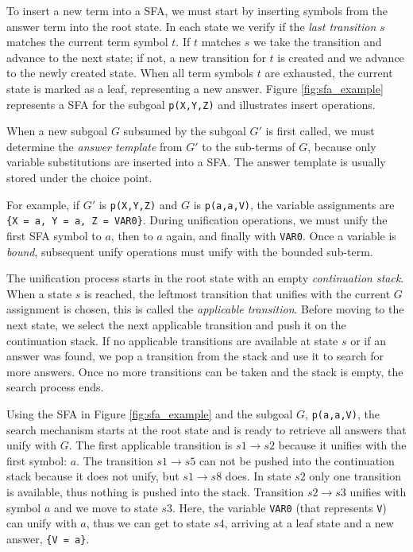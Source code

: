 To insert a new term into a SFA, we must start by inserting symbols from the answer term into the root state.
In each state we verify if the \textit{last transition} $s$ matches the current term symbol $t$. If $t$ matches $s$
we take the transition and advance to the next state; if not, a new transition for $t$ is created and we advance
to the newly created state. When all term symbols $t$ are exhausted, the current state is marked as a leaf,
representing a new answer.
Figure \ref{fig:sfa_example} represents a SFA for the subgoal \texttt{p(X,Y,Z)} and
illustrates insert operations.

When a new subgoal $G$ subsumed by the subgoal $G'$ is first called, we must determine the \textit{answer template}
from $G'$ to the sub-terms of $G$, because only variable substitutions are inserted into a SFA.
The answer template is usually stored under the choice point.

For example, if $G'$ is \texttt{p(X,Y,Z)} and $G$ is \texttt{p(a,a,V)}, the variable assignments
are \texttt{\{X~=~a,~Y~=~a,~Z~=~VAR0\}}. During unification operations, we must unify the first SFA symbol
to $a$, then to $a$ again, and finally with \texttt{VAR0}.
Once a variable is \textit{bound}, subsequent unify operations must unify with the bounded sub-term.

The unification process starts in the root state with an empty \textit{continuation stack}.
When a state $s$ is reached, the leftmost transition that unifies with the current $G$ assignment is chosen,
this is called the \textit{applicable transition}.
Before moving to the next state, we select the next applicable transition and push it on the continuation stack.
If no applicable transitions are available at state $s$ or if an answer was found, we pop a transition from
the stack and use it to search for more answers. Once no more transitions can be taken and the stack is empty, the
search process ends.

Using the SFA in Figure \ref{fig:sfa_example} and the subgoal $G$, \texttt{p(a,a,V)}, the search mechanism starts
at the root state and is ready to retrieve all answers that unify with $G$.
The first applicable transition is $s1 \rightarrow s2$ because it unifies with the first symbol: $a$. The transition
$s1 \rightarrow s5$ can not be pushed into the continuation stack because it does not unify, but $s1 \rightarrow s8$ does.
In state $s2$ only one transition is available, thus nothing is pushed into the stack.
Transition $s2 \rightarrow s3$ unifies with symbol $a$ and we move to state $s3$. Here, the variable \texttt{VAR0} (that represents \texttt{V})
can unify with $a$, thus we can get to state $s4$, arriving at a leaf state and a new answer, \texttt{\{V = a\}}.


